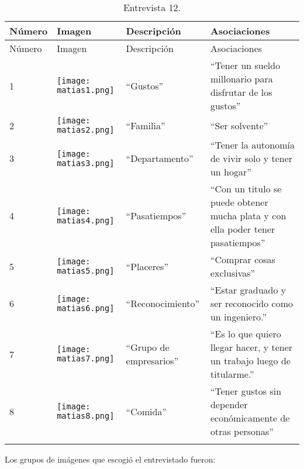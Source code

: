 \begin{longtable}{>{\centering\arraybackslash}m{1cm} >{\centering\arraybackslash}m{2cm} >{\arraybackslash}m{5cm}>{\arraybackslash}m{5cm}}
	
	\hline
	Número & Imagen & Descripción & Asociaciones \\
	\hline \hline
	\endfirsthead
	
	\hline
	Número & Imagen & Descripción & Asociaciones \\
	\hline \hline
	\endhead

1 & \texttt{[image: matias1.png]} & ``Gustos'' & ``Tener un sueldo millonario para disfrutar de los gustos'' \\
\hline

2 & \texttt{[image: matias2.png]} & ``Familia'' & ``Ser solvente'' \\
\hline

3 & \texttt{[image: matias3.png]} & ``Departamento'' & ``Tener la autonomía de vivir solo y tener un hogar'' \\
\hline

4 & \texttt{[image: matias4.png]} & ``Pasatiempos'' & ``Con un titulo se puede obtener mucha plata y con ella poder tener pasatiempos'' \\
\hline

5 & \texttt{[image: matias5.png]} & ``Placeres'' & ``Comprar cosas exclusivas'' \\
\hline

6 & \texttt{[image: matias6.png]} & ``Reconocimiento'' & ``Estar graduado y ser reconocido como un ingeniero.'' \\
\hline

7 & \texttt{[image: matias7.png]} & ``Grupo de empresarios'' & ``Es lo que quiero llegar hacer, y tener un trabajo luego de titularme.'' \\
\hline

8 & \texttt{[image: matias8.png]} & ``Comida'' & ``Tener gustos sin depender económicamente de otras personas'' \\
\hline


\caption{Entrevista 12.}
\label{tabla:matias}
\end{longtable}

Los grupos de imágenes que escogió el entrevistado fueron:\\


